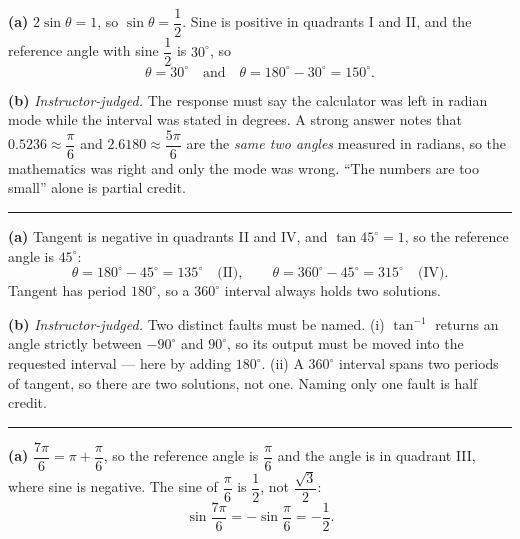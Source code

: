 \documentclass[12pt]{article}
\begin{document}
\textbf{(a)} $2\sin\theta = 1$, so $\sin\theta = \dfrac{1}{2}$. Sine is positive in quadrants I and II, and the reference angle with sine $\dfrac{1}{2}$ is $30^\circ$, so
\[ \theta = 30^\circ \quad\text{and}\quad \theta = 180^\circ - 30^\circ = 150^\circ. \]

\textbf{(b)} \emph{Instructor-judged.} The response must say the calculator was left in radian mode while the interval was stated in degrees. A strong answer notes that $0.5236 \approx \dfrac{\pi}{6}$ and $2.6180 \approx \dfrac{5\pi}{6}$ are the \emph{same two angles} measured in radians, so the mathematics was right and only the mode was wrong. ``The numbers are too small'' alone is partial credit.

\vspace{0.15cm}\noindent\rule{\linewidth}{0.2pt}\vspace{0.15cm}


\textbf{(a)} Tangent is negative in quadrants II and IV, and $\tan 45^\circ = 1$, so the reference angle is $45^\circ$:
\[ \theta = 180^\circ - 45^\circ = 135^\circ \quad\text{(II)}, \qquad \theta = 360^\circ - 45^\circ = 315^\circ \quad\text{(IV)}. \]
Tangent has period $180^\circ$, so a $360^\circ$ interval always holds two solutions. 

\textbf{(b)} \emph{Instructor-judged.} Two distinct faults must be named. (i) $\tan^{-1}$ returns an angle strictly between $-90^\circ$ and $90^\circ$, so its output must be moved into the requested interval --- here by adding $180^\circ$. (ii) A $360^\circ$ interval spans two periods of tangent, so there are two solutions, not one. Naming only one fault is half credit.

\vspace{0.15cm}\noindent\rule{\linewidth}{0.2pt}\vspace{0.15cm}


\textbf{(a)} $\dfrac{7\pi}{6} = \pi + \dfrac{\pi}{6}$, so the reference angle is $\dfrac{\pi}{6}$ and the angle is in quadrant III, where sine is negative. The sine of $\dfrac{\pi}{6}$ is $\dfrac{1}{2}$, not $\dfrac{\sqrt{3}}{2}$:
\[ \sin\frac{7\pi}{6} = -\sin\frac{\pi}{6} = -\frac{1}{2}. \]
\end{document}

